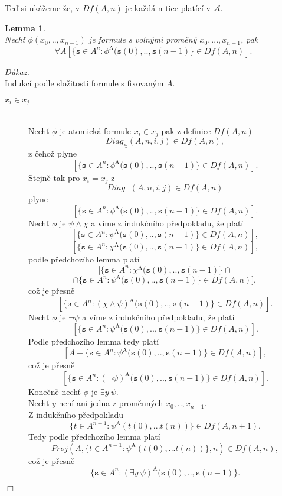 \documentclass[12pt,a4paper]{article}
\newtheorem{lemma}[veta]{Lemma}
\newenvironment{proof}
{\noindent \textit{D\r{u}kaz.}}
{\hspace*{\fill} $\Box$}
\begin{document}
Te\v{d} si uk\'{a}\v{z}eme \v{z}e, v $ Df(A,n) $ je ka\v{z}d\'{a} n-tice plat\'{i}c\'{i} v $ \mathcal{A} $.
\begin{lemma}%
~\\\label{lem:ntice}
Nech\v{t} $ \phi(x_0,..,x_{n-1})  $ je formule s voln\'{y}mi prom\v{e}n\'{y} $ x_0,...,x_{n-1}$, pak 
\[ \forall A [\{ \mathtt{s} \in A^n: \phi^\mathrm{A} (\mathtt{s}(0),..,\mathtt{s}(n-1)\} \in Df(A,n)].   \]
\end{lemma} 
\begin{proof}~\\
Indukc\'{i} podle slo\v{z}itosti formule s fixovan\'{y}m $A$.
\begin{description}
\item[$ x_i \in x_j $] ~\\
Nech\v{t} $ \phi $ je atomick\'{a} formule $ x_i \in x_j $ pak z definice  $ Df(A,n) $
\[ Diag_{\in}(A,n,i,j) \in Df(A,n), \]  
z \v{c}eho\v{z} plyne 
\[ [\{ \mathtt{s} \in A^n: \phi^\mathrm{A} (\mathtt{s}(0),..,\mathtt{s}(n-1)\} \in Df(A,n)] .\]
Stejn\v{e} tak pro $ x_i = x_j $  z  
\[ Diag_{=}(A,n,i,j) \in Df(A,n)  \] 
plyne 
\[ [\{ \mathtt{s} \in A^n: \phi^\mathrm{A} (\mathtt{s}(0),..,\mathtt{s}(n-1)\} \in Df(A,n)] .\]
Nech\v{t} $ \phi $ je $ \psi \wedge \chi $ a v\'{i}me z induk\v{c}n\'{i}ho p\v{r}edpokladu, \v{z}e plat\'{i} 
\[ [\{ \mathtt{s} \in A^n: \psi^\mathrm{A} (\mathtt{s}(0),..,\mathtt{s}(n-1)\} \in Df(A,n)], \]
\[ [\{ \mathtt{s} \in A^n: \chi^\mathrm{A} (\mathtt{s}(0),..,\mathtt{s}(n-1)\} \in Df(A,n)] ,\] 
podle p\v{r}edchoz\'{i}ho lemma plat\'{i} 
\[ [\{ \mathtt{s} \in A^n: \chi^\mathrm{A} (\mathtt{s}(0),..,\mathtt{s}(n-1)\} \cap \]  \[\cap \{ \mathtt{s} \in A^n: \psi^\mathrm{A} (\mathtt{s}(0),..,\mathtt{s}(n-1)\} \in Df(A,n)], \] 
co\v{z} je p\v{r}esn\v{e}
\[ [\{ \mathtt{s} \in A^n: (\chi \wedge \psi)^\mathrm{A} (\mathtt{s}(0),..,\mathtt{s}(n-1)\} \in Df(A,n)] .\]  
Nech\v{t} $ \phi $ je  $ \neg \psi $  a v\'{i}me z induk\v{c}n\'{i}ho p\v{r}edpokladu, \v{z}e plat\'{i} 
\[ [\{ \mathtt{s} \in A^n: \psi^\mathrm{A} (\mathtt{s}(0),..,\mathtt{s}(n-1)\} \in Df(A,n)] .\] 
Podle p\v{r}edchoz\'{i}ho lemma tedy plat\'{i} 
\[ [A-\{ \mathtt{s} \in A^n: \psi^\mathrm{A} (\mathtt{s}(0),..,\mathtt{s}(n-1)\} \in Df(A,n)], \] 
co\v{z} je p\v{r}esn\v{e}
\[ [\{ \mathtt{s} \in A^n: (\neg  \psi)^\mathrm{A} (\mathtt{s}(0),..,\mathtt{s}(n-1)\} \in Df(A,n)] .\] 
Kone\v{c}n\v{e}  nech\v{t} $ \phi $ je  $ \exists y ~\psi $. \\ 
Nech\v{t} $y$ nen\'{i} ani jedna z prom\v{e}nn\'{y}ch $ x_0,..,x_{n-1}$. \\
Z induk\v{c}n\'{i}ho p\v{r}edpokladu \[ \{t \in A^{n-1}: \psi^\mathrm{A}(t(0),...t(n))\} \in  Df(A,n+1).\] 
Tedy podle p\v{r}edchoz\'{i}ho lemma plat\'{i} 
\[ Proj(A,\{t \in A^{n-1}: \psi^\mathrm{A}(t(0),...t(n))\},n) \in  Df(A,n),\] 
co\v{z} je p\v{r}esn\v{e} 
\[  \{ \mathtt{s} \in A^n: (\exists y ~\psi)^\mathrm{A} (\mathtt{s}(0),..,\mathtt{s}(n-1)\} .\] 
\end{description} 
\end{proof}
\end{document}
